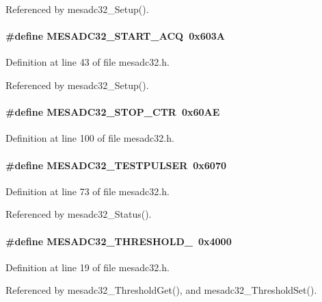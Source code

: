 Referenced by mesadc32\_\-Setup().
\paragraph[{MESADC32\_\-START\_\-ACQ}]{\setlength{\rightskip}{0pt plus 5cm}\#define MESADC32\_\-START\_\-ACQ~0x603A}\hfill\label{mesadc32_8h_aeddc68f825b1ac7fea919f4ca7afd1f4}


Definition at line 43 of file mesadc32.h.

Referenced by mesadc32\_\-Setup().
\paragraph[{MESADC32\_\-STOP\_\-CTR}]{\setlength{\rightskip}{0pt plus 5cm}\#define MESADC32\_\-STOP\_\-CTR~0x60AE}\hfill\label{mesadc32_8h_a8aaa52ce2c5a0d25930320315b7bf37b}


Definition at line 100 of file mesadc32.h.
\paragraph[{MESADC32\_\-TESTPULSER}]{\setlength{\rightskip}{0pt plus 5cm}\#define MESADC32\_\-TESTPULSER~0x6070}\hfill\label{mesadc32_8h_a526b9dbd29406eaa5bca76cb42a895c7}


Definition at line 73 of file mesadc32.h.

Referenced by mesadc32\_\-Status().
\paragraph[{MESADC32\_\-THRESHOLD\_\-0}]{\setlength{\rightskip}{0pt plus 5cm}\#define MESADC32\_\-THRESHOLD\_~0x4000}\hfill\label{mesadc32_8h_a5ba7811ad08030aaf2e46ebb3e1a3707}


Definition at line 19 of file mesadc32.h.

Referenced by mesadc32\_\-ThresholdGet(), and mesadc32\_\-ThresholdSet().
